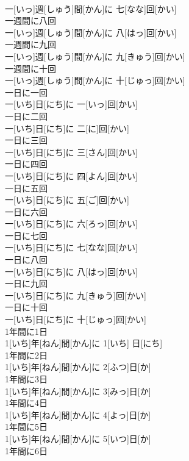 \documentclass[8pt]{extreport}
\begin{document}
\begin{CJK}{UTF8}{min}
\\	一[いっ]週[しゅう]間[かん]に 七[なな]回[かい]
\\	一週間に八回	
\\	一[いっ]週[しゅう]間[かん]に 八[はっ]回[かい]
\\	一週間に九回	
\\	一[いっ]週[しゅう]間[かん]に 九[きゅう]回[かい]
\\	一週間に十回	
\\	一[いっ]週[しゅう]間[かん]に 十[じゅっ]回[かい]
\\	一日に一回	
\\	一[いち]日[にち]に 一[いっ]回[かい]
\\	一日に二回	
\\	一[いち]日[にち]に 二[に]回[かい]
\\	一日に三回	
\\	一[いち]日[にち]に 三[さん]回[かい]
\\	一日に四回	
\\	一[いち]日[にち]に 四[よん]回[かい]
\\	一日に五回	
\\	一[いち]日[にち]に 五[ご]回[かい]
\\	一日に六回	
\\	一[いち]日[にち]に 六[ろっ]回[かい]
\\	一日に七回	
\\	一[いち]日[にち]に 七[なな]回[かい]
\\	一日に八回	
\\	一[いち]日[にち]に 八[はっ]回[かい]
\\	一日に九回	
\\	一[いち]日[にち]に 九[きゅう]回[かい]
\\	一日に十回	
\\	一[いち]日[にち]に 十[じゅっ]回[かい]
\\	1年間に1日	
\\	1[いち]年[ねん]間[かん]に 1[いち] 日[にち]
\\	1年間に2日	
\\	1[いち]年[ねん]間[かん]に 2[ふつ]日[か]
\\	1年間に3日	
\\	1[いち]年[ねん]間[かん]に 3[みっ]日[か]
\\	1年間に4日	
\\	1[いち]年[ねん]間[かん]に 4[よっ]日[か]
\\	1年間に5日	
\\	1[いち]年[ねん]間[かん]に 5[いつ]日[か]
\\	1年間に6日	

\end{CJK}
\end{document}
